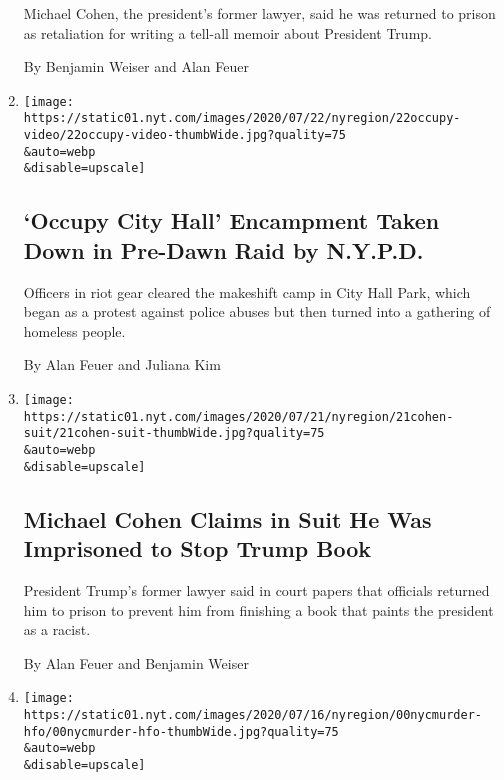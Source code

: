 \begin{enumerate}
  Michael Cohen, the president's former lawyer, said he was returned to
  prison as retaliation for writing a tell-all memoir about President
  Trump.

  By Benjamin Weiser and Alan Feuer
\item
  \href{/2020/07/22/nyregion/occupy-city-hall-protest-nypd.html}{}

  \texttt{[image: https://static01.nyt.com/images/2020/07/22/nyregion/22occupy-video/22occupy-video-thumbWide.jpg?quality=75\\\&auto=webp\\\&disable=upscale]}

  \hypertarget{occupy-city-hall-encampment-taken-down-in-pre-dawn-raid-by-nypd}{%
  \subsection{`Occupy City Hall' Encampment Taken Down in Pre-Dawn Raid
  by
  N.Y.P.D.}\label{occupy-city-hall-encampment-taken-down-in-pre-dawn-raid-by-nypd}}

  Officers in riot gear cleared the makeshift camp in City Hall Park,
  which began as a protest against police abuses but then turned into a
  gathering of homeless people.

  By Alan Feuer and Juliana Kim
\item
  \href{/2020/07/21/nyregion/michael-cohen-trump-book.html}{}

  \texttt{[image: https://static01.nyt.com/images/2020/07/21/nyregion/21cohen-suit/21cohen-suit-thumbWide.jpg?quality=75\\\&auto=webp\\\&disable=upscale]}

  \hypertarget{michael-cohen-claims-in-suit-he-was-imprisoned-to-stop-trump-book}{%
  \subsection{Michael Cohen Claims in Suit He Was Imprisoned to Stop
  Trump
  Book}\label{michael-cohen-claims-in-suit-he-was-imprisoned-to-stop-trump-book}}

  President Trump's former lawyer said in court papers that officials
  returned him to prison to prevent him from finishing a book that
  paints the president as a racist.

  By Alan Feuer and Benjamin Weiser
\item
  \href{/2020/07/17/nyregion/fahim-saleh-suspect-tyrese-devon-haspil.html}{}

  \texttt{[image: https://static01.nyt.com/images/2020/07/16/nyregion/00nycmurder-hfo/00nycmurder-hfo-thumbWide.jpg?quality=75\\\&auto=webp\\\&disable=upscale]}


\end{enumerate}
